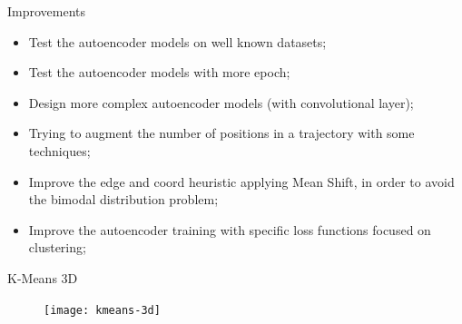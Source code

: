 \documentclass{beamer}
\begin{document}
\begin{frame}{Improvements}
	\begin{itemize}
		\item Test the autoencoder models on well known datasets;
		\item Test the autoencoder models with more epoch;
		\item Design more complex autoencoder models (with convolutional layer);
		\item Trying to augment the number of positions in a trajectory with some techniques;
		\item Improve the edge and coord heuristic applying Mean Shift, in order to avoid the bimodal distribution problem;
		\item Improve the autoencoder training with specific loss functions focused on clustering; 
	\end{itemize}
\end{frame}

\begin{frame}{K-Means 3D}
\begin{figure}[bt]
	\centering
	\texttt{[image: kmeans-3d]}
	\label{fig:kmeans-3d}
\end{figure}
\end{frame}
\end{document}
